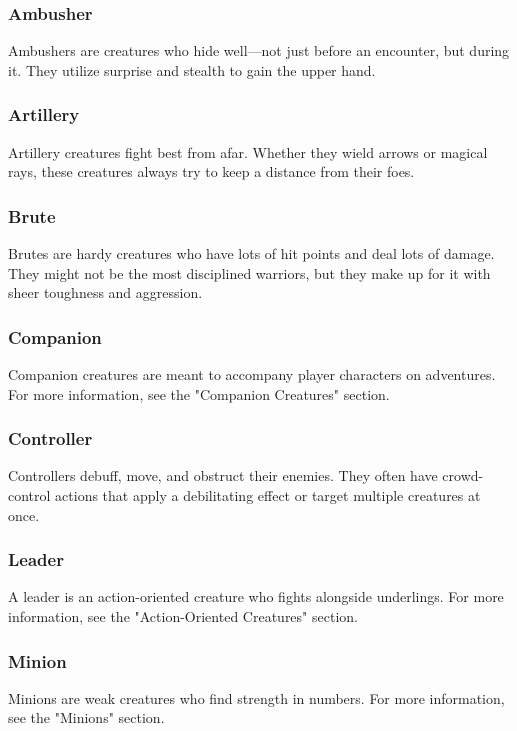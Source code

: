 \documentclass[10pt,a4paper,twoside,bg=print,twocolumn,openany,nodeprecatedcode]{dndbook}
\begin{document}
\subsubsection{Ambusher}
Ambushers are creatures who hide well—not just before an encounter, but during it. They utilize surprise and stealth to gain the upper hand.

\subsubsection{Artillery}
Artillery creatures fight best from afar. Whether they wield arrows or magical rays, these creatures always try to keep a distance from their foes.

\subsubsection{Brute}
Brutes are hardy creatures who have lots of hit points and deal lots of damage. They might not be the most disciplined warriors, but they make up for it with sheer toughness and aggression.

\subsubsection{Companion}
Companion creatures are meant to accompany player characters on adventures. For more information, see the "Companion Creatures" section.

\subsubsection{Controller}
Controllers debuff, move, and obstruct their enemies. They often have crowd-control actions that apply a debilitating effect or target multiple creatures at once.

\subsubsection{Leader}
A leader is an action-oriented creature who fights alongside underlings. For more information, see the "Action-Oriented Creatures" section.

\subsubsection{Minion}
Minions are weak creatures who find strength in numbers. For more information, see the "Minions" section.
\end{document}
